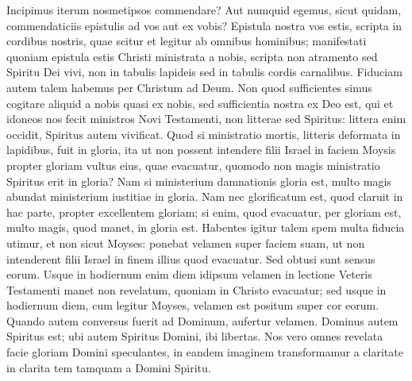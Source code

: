 \begin{biblechapter}  
\verse Incipimus iterum nosmetipsos commendare? Aut numquid egemus, sicut quidam, commendaticiis epistulis ad vos aut ex vobis? 
\verse Epistula nostra vos estis, scripta in cordibus nostris, quae scitur et legitur ab omnibus hominibus; 
\verse manifestati quoniam epistula estis Christi ministrata a nobis, scripta non atramento sed Spiritu Dei vivi, non in tabulis lapideis sed in tabulis cordis carnalibus. 
\verse Fiduciam autem talem habemus per Christum ad Deum. 
\verse Non quod sufficientes simus cogitare aliquid a nobis quasi ex nobis, sed sufficientia nostra ex Deo est, 
\verse qui et idoneos nos fecit ministros Novi Testamenti, non litterae sed Spiritus: littera enim occidit, Spiritus autem vivificat. 
\verse Quod si ministratio mortis, litteris deformata in lapidibus, fuit in gloria, ita ut non possent intendere filii Israel in faciem Moysis propter gloriam vultus eius, quae evacuatur, 
\verse quomodo non magis ministratio Spiritus erit in gloria? 
\verse Nam si ministerium damnationis gloria est, multo magis abundat ministerium iustitiae in gloria. 
\verse Nam nec glorificatum est, quod claruit in hac parte, propter excellentem gloriam; 
\verse si enim, quod evacuatur, per gloriam est, multo magis, quod manet, in gloria est. 
\verse Habentes igitur talem spem multa fiducia utimur, 
\verse et non sicut Moyses: ponebat velamen super faciem suam, ut non intenderent filii Israel in finem illius quod evacuatur. 
\verse Sed obtusi sunt sensus eorum. Usque in hodiernum enim diem idipsum velamen in lectione Veteris Testamenti manet non revelatum, quoniam in Christo evacuatur; 
\verse sed usque in hodiernum diem, cum legitur Moyses, velamen est positum super cor eorum. 
\verse Quando autem conversus fuerit ad Dominum, aufertur velamen. 
\verse Dominus autem Spiritus est; ubi autem Spiritus Domini, ibi libertas. 
\verse Nos vero omnes revelata facie gloriam Domini speculantes, in eandem imaginem transformamur a claritate in clarita tem tamquam a Domini Spiritu.   
\end{biblechapter}

